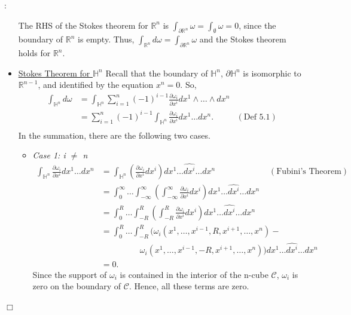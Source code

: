 \documentclass{article}
\theoremstyle{definition}
\theoremstyle{named}
\def\endproofmark{$\Box$}
\newenvironment{proof}{\par\noindent{\bf Proof}:}{\endproofmark\smallskip}
\begin{document}
\begin{proof}
\begin{itemize}
        The RHS of the Stokes theorem for $\mathbb{R}^n$ is $\int_{\partial \mathbb{R}^n} \omega = \int_{\emptyset} \omega = 0$, since the boundary of $\mathbb{R}^n$ is empty. Thus, $\int_{\mathbb{R}^n} d\omega = \int_{\partial \mathbb{R}^n} \omega $ and the Stokes theorem holds for $\mathbb{R}^n$.
        \item \underline{Stokes Theorem for $\mathbb{H}^n$}
        Recall that the boundary of $\mathbb{H}^n$, $\partial \mathbb{H}^n$ is isomorphic to $\mathbb{R}^{n-1}$, and identified by the equation $x^n = 0$. So, 
        \begin{align*}
            \int_{\mathbb{H}^n} d\omega &= \int_{\mathbb{H}^n} \sum_{i=1}^n (-1)^{i-1} \frac{\partial \omega_i}{\partial x^i} dx^1 \wedge \ldots \wedge dx^n \\
            &= \sum_{i=1}^n (-1)^{i-1} \int_{\mathbb{H}^n}   \frac{\partial \omega_i}{\partial x^i} dx^1 \ldots dx^n . & (\text{Def 5.1}) \\
        \end{align*}
        In the summation, there are the following two cases.
        \begin{itemize}
            \item \emph{Case 1: i $\neq$ n}
            \begin{align*}
                \int_{\mathbb{H}^n}   \frac{\partial \omega_i}{\partial x^i} dx^1 \ldots dx^n &= \int_{\mathbb{H}^n}  \left( \frac{\partial \omega_i}{\partial x^i} dx^i \right) dx^1 \ldots \widehat{dx^i} \ldots dx^n \ \ \ \ \ \ \ \ \ \ \ \ \ \ \ \ \ \ \ \ \ \ \ \ \ \ \ \ \ (\text{Fubini's Theorem})\\
                &=\int_{0}^{\infty} \ldots \int_{-\infty}^{\infty} \left(\int_{-\infty}^{\infty} \frac{\partial \omega_i}{\partial x^i} dx^i\right) dx^1 \ldots \widehat{dx^i} \ldots dx^n \\
                &= \int_{0}^{R} \ldots \int_{-R}^{R} \left(\int_{-R}^{R} \frac{\partial \omega_i}{\partial x^i} dx^i\right) dx^1 \ldots \widehat{dx^i} \ldots dx^n \\
                &= \int_{0}^{R} \ldots \int_{-R}^{R} (\omega_i(x^1, \ldots, x^{i-1}, R, x^{i+1}, \ldots, x^n) - \\
                & \ \ \ \ \ \ \ \ \ \ \ \  \ \ \ \ \ \ \ \ \ \omega_i(x^1, \ldots, x^{i-1}, -R, x^{i+1}, \ldots, x^n)) dx^1 \ldots \widehat{dx^i} \ldots dx^n \\
                &= 0.
            \end{align*}
            Since the support of $\omega_i$ is contained in the interior of the n-cube $\mathcal{C}$, $\omega_i$ is zero on the boundary of $\mathcal{C}$. Hence, all these terms are zero.  

\end{itemize}
\end{itemize}
\end{proof}
\end{document}

